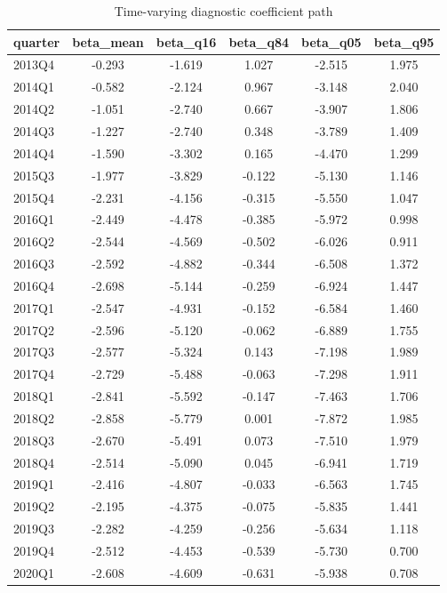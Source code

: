 \begin{table}[!htbp]
\centering
\caption{Time-varying diagnostic coefficient path}
\label{tab:beta_t_path}
\begin{threeparttable}
\begin{tabular}{lccccc}
\toprule
quarter & beta\_mean & beta\_q16 & beta\_q84 & beta\_q05 & beta\_q95 \\
\midrule
2013Q4 & -0.293 & -1.619 & 1.027 & -2.515 & 1.975 \\
2014Q1 & -0.582 & -2.124 & 0.967 & -3.148 & 2.040 \\
2014Q2 & -1.051 & -2.740 & 0.667 & -3.907 & 1.806 \\
2014Q3 & -1.227 & -2.740 & 0.348 & -3.789 & 1.409 \\
2014Q4 & -1.590 & -3.302 & 0.165 & -4.470 & 1.299 \\
2015Q3 & -1.977 & -3.829 & -0.122 & -5.130 & 1.146 \\
2015Q4 & -2.231 & -4.156 & -0.315 & -5.550 & 1.047 \\
2016Q1 & -2.449 & -4.478 & -0.385 & -5.972 & 0.998 \\
2016Q2 & -2.544 & -4.569 & -0.502 & -6.026 & 0.911 \\
2016Q3 & -2.592 & -4.882 & -0.344 & -6.508 & 1.372 \\
2016Q4 & -2.698 & -5.144 & -0.259 & -6.924 & 1.447 \\
2017Q1 & -2.547 & -4.931 & -0.152 & -6.584 & 1.460 \\
2017Q2 & -2.596 & -5.120 & -0.062 & -6.889 & 1.755 \\
2017Q3 & -2.577 & -5.324 & 0.143 & -7.198 & 1.989 \\
2017Q4 & -2.729 & -5.488 & -0.063 & -7.298 & 1.911 \\
2018Q1 & -2.841 & -5.592 & -0.147 & -7.463 & 1.706 \\
2018Q2 & -2.858 & -5.779 & 0.001 & -7.872 & 1.985 \\
2018Q3 & -2.670 & -5.491 & 0.073 & -7.510 & 1.979 \\
2018Q4 & -2.514 & -5.090 & 0.045 & -6.941 & 1.719 \\
2019Q1 & -2.416 & -4.807 & -0.033 & -6.563 & 1.745 \\
2019Q2 & -2.195 & -4.375 & -0.075 & -5.835 & 1.441 \\
2019Q3 & -2.282 & -4.259 & -0.256 & -5.634 & 1.118 \\
2019Q4 & -2.512 & -4.453 & -0.539 & -5.730 & 0.700 \\
2020Q1 & -2.608 & -4.609 & -0.631 & -5.938 & 0.708 \\

\end{tabular}
\end{threeparttable}
\end{table}
